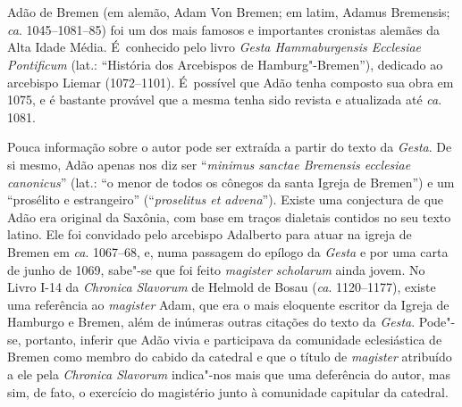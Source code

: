 
\renewcommand*{\chapnumfont}{\normalfont\HUGE\bfseries\sffamily}
\renewcommand*{\chaptitlefont}{\normalfont\fontsize{50}{60}\selectfont\bfseries\sffamily}


\openany

\section{  }

Adão de Bremen (em alemão, Adam Von Bremen; em latim, Adamus Bremensis;
\emph{ca}. 1045--1081--85) foi um dos mais famosos e importantes
cronistas alemães da Alta Idade Média. É~conhecido pelo livro
\emph{Gesta Hammaburgensis Ecclesiae Pontificum} (lat.: ``História dos
Arcebispos de Hamburg"-Bremen''), dedicado ao arcebispo Liemar
(1072--1101). É~possível que Adão tenha composto sua obra em 1075, e é
bastante provável que a mesma tenha sido revista e atualizada até
\emph{ca}. 1081.

Pouca informação sobre o autor pode ser extraída a partir do texto da
\emph{Gesta}. De si mesmo, Adão apenas nos diz ser ``\emph{minimus
sanctae Bremensis ecclesiae canonicus}'' (lat.: ``o menor de todos os
cônegos da santa Igreja de Bremen'') e um ``prosélito e estrangeiro''
(``\emph{proselitus et advena}''). Existe uma conjectura de que Adão era
original da Saxônia, com base em traços dialetais contidos no seu texto
latino. Ele foi convidado pelo arcebispo Adalberto para atuar na igreja
de Bremen em \emph{ca}. 1067--68, e, numa passagem do epílogo da
\emph{Gesta} e por uma carta de junho de 1069, sabe"-se que foi feito
\emph{magister scholarum} ainda jovem. No Livro I-14 da \emph{Chronica
Slavorum} de Helmold de Bosau (\emph{ca}. 1120--1177), existe uma
referência ao \emph{magister} Adam, que era o mais eloquente escritor da
Igreja de Hamburgo e Bremen, além de inúmeras outras citações do texto
da \emph{Gesta}. Pode"-se, portanto, inferir que Adão vivia e participava
da comunidade eclesiástica de Bremen como membro do cabido da catedral e
que o título de \emph{magister} atribuído a ele pela \emph{Chronica
Slavorum} indica"-nos mais que uma deferência do autor, mas sim, de fato,
o exercício do magistério junto à comunidade capitular da catedral.

